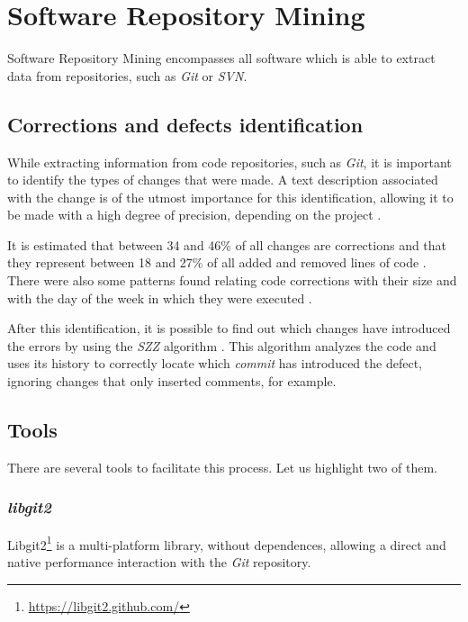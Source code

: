 \section{Software Repository Mining}

Software Repository Mining encompasses all software which is able to extract data from repositories, such as \emph{Git} or \emph{SVN}.

\subsection{Corrections and defects identification}

While extracting information from code repositories, such as \emph{Git}, it is important to identify the types of changes that were made. A text description associated with the change is of the utmost importance for this identification, allowing it to be made with a high degree of precision, depending on the project \cite{Mockus2000}.

It is estimated that between 34 and 46\% of all changes are corrections and that they represent between 18 and 27\% of all added and removed lines of code \cite{Mockus2000}. There were also some patterns found relating code corrections with their size and with the day of the week in which they were executed \cite{Sliwerski2005}.

After this identification, it is possible to find out which changes have introduced the errors by using the \emph{SZZ} algorithm \cite{Sliwerski2005}. This algorithm analyzes the code and uses its history to correctly locate which \emph{commit} has introduced the defect, ignoring changes that only inserted comments, for example.

\subsection{Tools}

There are several tools to facilitate this process. Let us highlight two of them.

\subsubsection{\emph{libgit2}}

Libgit2\footnote{\url{https://libgit2.github.com/}} is a multi-platform library, without dependences, allowing a direct and native performance interaction with the \emph{Git} repository.

